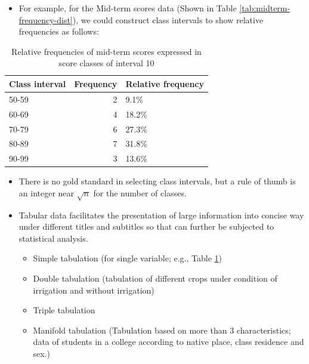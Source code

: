 \documentclass[
  ignorenonframetext,
  aspectratio=169]{beamer}
\providecommand{\tightlist}{%
  \setlength{\itemsep}{0pt}\setlength{\parskip}{0pt}}
\begin{document}
\begin{frame}{}
\protect\hypertarget{section-3}{}
\begin{itemize}
\tightlist
\item
  For example, for the Mid-term scores data (Shown in Table
  \ref{tab:midterm-frequency-dist}), we could construct class intervals
  to show relative frequencies as follows:
\end{itemize}

\begin{table}

\caption{\label{tab:midterm-frequency-class-tab}Relative frequencies of mid-term scores expressed in score classes of interval 10}
\centering
\begin{tabular}[t]{lrl}
\toprule
Class interval & Frequency & Relative frequency\\
\midrule
50-59 & 2 & 9.1\%\\
60-69 & 4 & 18.2\%\\
70-79 & 6 & 27.3\%\\
80-89 & 7 & 31.8\%\\
90-99 & 3 & 13.6\%\\
\bottomrule
\end{tabular}
\end{table}

\begin{itemize}
\tightlist
\item
  There is no gold standard in selecting class intervals, but a rule of
  thumb is an integer near \(\sqrt n\) for the number of classes.
\end{itemize}
\end{frame}

\begin{frame}{}
\protect\hypertarget{section-4}{}
\begin{itemize}
\tightlist
\item
  Tabular data facilitates the presentation of large information into
  concise way under different titles and subtitles so that can further
  be subjected to statistical analysis.

  \begin{itemize}
  \tightlist
  \item
    Simple tabulation (for single variable; e.g., Table
    \ref{tab:midterm-frequency-class-tab})
  \item
    Double tabulation (tabulation of different crops under condition of
    irrigation and without irrigation)
  \item
    Triple tabulation
  \item
    Manifold tabulation (Tabulation based on more than 3
    characteristics; data of students in a college according to native
    place, class residence and sex.)
  \end{itemize}
\end{itemize}
\end{frame}
\end{document}
